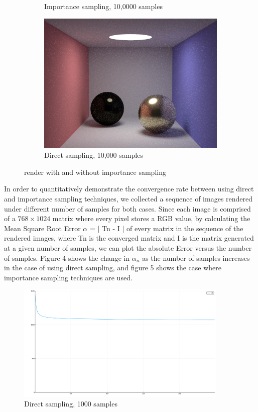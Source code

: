 \documentclass[12pt]{article}
\begin{document}
\begin{figure}
\begin{subfigure}{.5\textwidth}
  \caption{Importance sampling, 10,0000 samples}
  \label{fig:sub1}
\end{subfigure}%
\begin{subfigure}{.5\textwidth}
  \centering
  \includegraphics[width=.9\linewidth]{10KDS.png}
  \caption{Direct sampling, 10,000 samples}
  \label{fig:sub1}
\end{subfigure}%
\caption{render with and without importance sampling}
\label{fig:test}
\end{figure}

\noindent In order to quantitatively demonstrate the convergence rate between using direct and importance sampling techniques, we collected a sequence of images rendered under different number of samples for both cases. Since each image is comprised of a $768\times 1024$ matrix where every pixel stores a RGB value, by calculating the Mean Square Root Error $\alpha$ = $|$ Tn - I $|$ of every matrix in the sequence of the rendered images, where Tn is the converged matrix and I is the matrix generated at a given number of samples, we can plot the absolute Error versus the number of samples. Figure 4 shows the change in $\alpha_n$ as the number of samples increases in the case of using direct sampling, and figure 5 shows the case where importance sampling techniques are used.

\begin{figure}[H]
  \centering
    \includegraphics[width=0.9\textwidth]{DS1000.png}
    \caption{Direct sampling, 1000 samples}
\end{figure}
\end{document}
